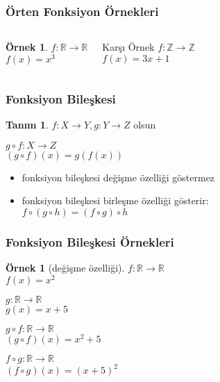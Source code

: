 \documentclass[dvipsnames]{beamer}
\theoremstyle{definition}
\newtheorem{tanim}[theorem]{Tanım}
\theoremstyle{example}
\newtheorem{ornek}[theorem]{Örnek}
\theoremstyle{plain}
\begin{document}
\begin{frame}
  \frametitle{Örten Fonksiyon Örnekleri}

  \begin{columns}
    \begin{ornek}
      $f: \mathbb{R} \rightarrow \mathbb{R}$\\
      $f(x) = x^3$
    \end{ornek}

    \pause
    \begin{block}{Karşı Örnek}
      $f: \mathbb{Z} \rightarrow \mathbb{Z}$\\
      $f(x) = 3x + 1$
    \end{block}
  \end{columns}
\end{frame}

\begin{frame}
  \frametitle{Fonksiyon Bileşkesi}

  \begin{tanim}
    $f: X \rightarrow Y, g: Y \rightarrow Z$ olsun

    \medskip
    $g \circ f: X \rightarrow Z$\\
    $(g \circ f)(x) = g(f(x))$
  \end{tanim}

  \pause
  \begin{itemize}
    \item fonksiyon bileşkesi değişme özelliği göstermez
    \item fonksiyon bileşkesi birleşme özelliği gösterir:\\
      $f \circ (g \circ h) = (f \circ g) \circ h$
  \end{itemize}
\end{frame}

\begin{frame}
  \frametitle{Fonksiyon Bileşkesi Örnekleri}

  \begin{ornek}[değişme özelliği]
    $f: \mathbb{R} \rightarrow \mathbb{R}$\\
    $f(x) = x^2$

    \medskip
    $g: \mathbb{R} \rightarrow \mathbb{R}$\\
    $g(x) = x + 5$

    \pause
    \bigskip
    $g \circ f: \mathbb{R} \rightarrow \mathbb{R}$\\
    $(g \circ f)(x) = x^2 + 5$

    \pause
    \medskip
    $f \circ g: \mathbb{R} \rightarrow \mathbb{R}$\\
    $(f \circ g)(x) = (x + 5)^2$
  \end{ornek}
\end{frame}
\end{document}
